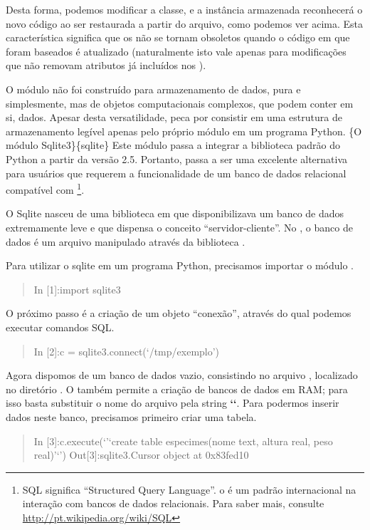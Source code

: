 \documentclass[a4paper,10pt,portuguese]{sphinxmanual}
\begin{document}
Desta forma, podemos modificar a classe, e a instância armazenada
reconhecerá o novo código ao ser restaurada a partir do arquivo,
como podemos ver acima. Esta característica significa que os
 não se tornam obsoletos quando o código em que foram
baseados é atualizado (naturalmente isto vale apenas para
modificações que não removam atributos já incluídos nos
).

O módulo  não foi construído para armazenamento de dados,
pura e simplesmente, mas de objetos computacionais complexos, que
podem conter em si, dados. Apesar desta versatilidade, peca por
consistir em uma estrutura de armazenamento legível apenas pelo
próprio módulo  em um programa Python.
\{O módulo Sqlite3\}\{sqlite\} Este módulo passa a integrar a
biblioteca padrão do Python a partir da versão 2.5. Portanto, passa
a ser uma excelente alternativa para usuários que requerem a
funcionalidade de um banco de dados relacional compatível com
 \footnote{
SQL significa ``Structured Query Language''. o  é um padrão
internacional na interação com bancos de dados relacionais. Para
saber mais, consulte \href{http://pt.wikipedia.org/wiki/SQL}{http://pt.wikipedia.org/wiki/SQL}
}.

O Sqlite nasceu de uma biblioteca em  que disponibilizava um
banco de dados extremamente leve e que dispensa o conceito
``servidor-cliente''. No , o banco de dados é um arquivo
manipulado através da biblioteca .

Para utilizar o sqlite em um programa Python, precisamos importar o
módulo .
\begin{quote}

In {[}1{]}:import sqlite3
\end{quote}

O próximo passo é a criação de um objeto ``conexão'', através do qual
podemos executar comandos SQL.
\begin{quote}

In {[}2{]}:c = sqlite3.connect(`/tmp/exemplo')
\end{quote}

Agora dispomos de um banco de dados vazio, consistindo no arquivo
, localizado no diretório . O  também
permite a criação de bancos de dados em RAM; para isso basta
substituir o nome do arquivo pela string {\color{red}\bfseries{}{}`{}`}. Para
podermos inserir dados neste banco, precisamos primeiro criar uma
tabela.
\begin{quote}

In {[}3{]}:c.execute(`'`create table especimes(nome text, altura real,
peso real)'`') Out{[}3{]}:sqlite3.Cursor object at 0x83fed10
\end{quote}
\end{document}

